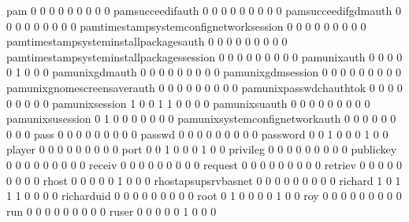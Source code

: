 \documentclass[compress,8pt]{beamer}
\begin{document}
\begin{frame}
\begin{Schunk}
  pam                                        0   0   0   0   0   0   0   0   0
  pamsucceedifauth                           0   0   0   0   0   0   0   0   0
  pamsucceedifgdmauth                        0   0   0   0   0   0   0   0   0
  pamtimestampsystemconfignetworksession     0   0   0   0   0   0   0   0   0
  pamtimestampsysteminstallpackagesauth      0   0   0   0   0   0   0   0   0
  pamtimestampsysteminstallpackagessession   0   0   0   0   0   0   0   0   0
  pamunixauth                                0   0   0   0   0   1   0   0   0
  pamunixgdmauth                             0   0   0   0   0   0   0   0   0
  pamunixgdmsession                          0   0   0   0   0   0   0   0   0
  pamunixgnomescreensaverauth                0   0   0   0   0   0   0   0   0
  pamunixpasswdchauthtok                     0   0   0   0   0   0   0   0   0
  pamunixsession                             1   0   0   1   1   0   0   0   0
  pamunixsuauth                              0   0   0   0   0   0   0   0   0
  pamunixsusession                           0   1   0   0   0   0   0   0   0
  pamunixsystemconfignetworkauth             0   0   0   0   0   0   0   0   0
  pass                                       0   0   0   0   0   0   0   0   0
  passwd                                     0   0   0   0   0   0   0   0   0
  password                                   0   0   1   0   0   0   1   0   0
  player                                     0   0   0   0   0   0   0   0   0
  port                                       0   0   1   0   0   0   1   0   0
  privileg                                   0   0   0   0   0   0   0   0   0
  publickey                                  0   0   0   0   0   0   0   0   0
  receiv                                     0   0   0   0   0   0   0   0   0
  request                                    0   0   0   0   0   0   0   0   0
  retriev                                    0   0   0   0   0   0   0   0   0
  rhost                                      0   0   0   0   0   1   0   0   0
  rhostapsupsrvbasnet                        0   0   0   0   0   0   0   0   0
  richard                                    1   0   1   1   1   0   0   0   0
  richarduid                                 0   0   0   0   0   0   0   0   0
  root                                       0   1   0   0   0   0   1   0   0
  roy                                        0   0   0   0   0   0   0   0   0
  run                                        0   0   0   0   0   0   0   0   0
  ruser                                      0   0   0   0   0   1   0   0   0

\end{Schunk}
\end{frame}
\end{document}
